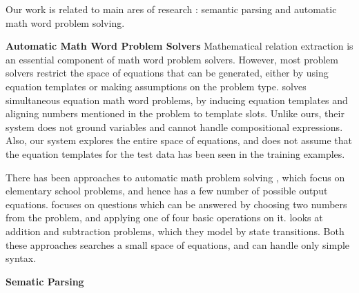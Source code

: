   Our work is related to main ares of research : semantic parsing and
  automatic math word problem solving.

  \noindent
  \textbf{Automatic Math Word Problem Solvers} Mathematical relation
  extraction is an essential component of math word problem
  solvers. However, most problem solvers restrict the space of
  equations that can be generated, either by using equation templates
  or making assumptions on the problem type. \cite{KushmanZeBa14} solves
  simultaneous equation math word problems, by inducing equation
  templates and aligning numbers mentioned in the problem to template
  slots. Unlike ours, their system does not ground variables and
  cannot handle compositional expressions. Also, our system explores
  the entire space of equations, and does not assume that the equation
  templates for the test data has been seen in the training examples.

  There has been approaches to automatic math problem
  solving \cite{RoyViRo15,HosseiniHaEt14}, which focus on elementary
  school problems, and hence has a few number of possible output
  equations. \cite{RoyViRo15} focuses on questions which can be
  answered by choosing two numbers from the problem, and applying one
  of four basic operations on it. \cite{HosseiniHaEt14} looks at
  addition and subtraction problems, which they model by state
  transitions. Both these approaches searches a small space of
  equations, and can handle only simple syntax.

  \noindent
  \textbf{Sematic Parsing} 
  
